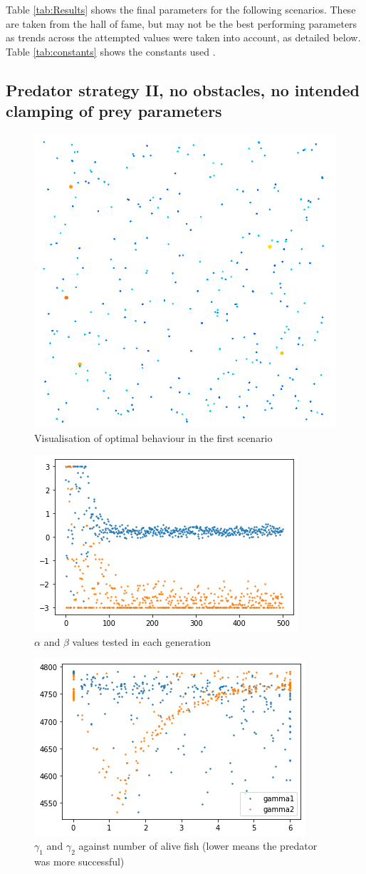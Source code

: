 \documentclass[12pt]{article}
\begin{document}
Table  \ref{tab:Results} shows the final parameters for the following scenarios. These are taken from the hall of fame, but may not be the best performing parameters as trends across the attempted values were taken into account, as detailed below. Table \ref{tab:constants} shows the constants used\supercite{Giske2008_EmergingSchoolStructures}\,\supercite{HartonoNguyenTa2024}\,\supercite{TaNguyenYagi2017_foraging}.
\subsection{Predator strategy II, no obstacles, no intended clamping of prey parameters}

\begin{figure}[H]
    \centering
    \includegraphics[width=0.5\linewidth]{ii.png}
    \caption{Visualisation of optimal behaviour in the first scenario}
    \label{fig:ii}
\end{figure}
\begin{figure}[H]
    \centering
    \includegraphics[width=0.5\linewidth]{fig/2-alpha-beta-1.png}
    \caption{$\alpha$ and $\beta$ values tested in each generation}
    \label{fig:a_b_2}
\end{figure}
\begin{figure}[H]
    \centering
    \includegraphics[width=0.5\linewidth]{fig/2_gammas_pred.png}
    \caption{$\gamma_1$ and $\gamma_2$ against number of alive fish (lower means the predator was more successful)}
    \label{fig:2_gammas}
\end{figure}
\end{document}
